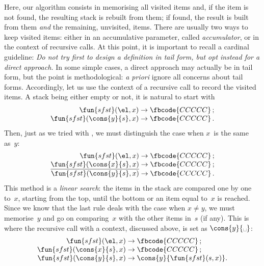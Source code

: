 Here, our algorithm consists in memorising all visited items and, if
the item is not found, the resulting stack is rebuilt from them; if
found, the result is built from them \emph{and} the remaining,
unvisited, items. There are usually two ways to keep visited items:
either in an accumulative parameter, called \emph{accumulator}, or in
the context of recursive calls. At this point, it is important to
recall a cardinal guideline: \emph{Do not try first to design a
definition in tail form, but opt instead for a direct approach.} In
some simple cases, a direct approach may actually be in tail form, but
the point is methodological: \emph{a priori} ignore all concerns about
tail forms. Accordingly, let us use the context of a recursive call to
record the visited items. A stack being either empty or not, it is
natural to start with
\begin{equation*}
\begin{array}{r@{\;}l@{\;}l}
\fun{sfst}(\el,x) & \rightarrow & \fbcode{CCCCC}\,;\\
\fun{sfst}(\cons{y}{s},x) & \rightarrow & \fbcode{CCCCC}\,.
\end{array}
\end{equation*}
Then, just as we tried with , we must distinguish the
case when \(x\)~is the same as~\(y\):
\begin{equation*}
\begin{array}{r@{\;}l@{\;}l}
\fun{sfst}(\el,x) & \rightarrow & \fbcode{CCCCC}\,;\\
\underline{\fun{sfst}(\cons{x}{s},x)} & \rightarrow & \fbcode{CCCCC}\,;\\
\fun{sfst}(\cons{y}{s},x) & \rightarrow & \fbcode{CCCCC}\,.
\end{array}
\end{equation*}
This method is a \emph{linear search}: the items
in the stack are compared one by one to~\(x\), starting from the top,
until the bottom or an item equal to~\(x\) is reached. Since we know
that the last rule deals with the case when \(x \neq y\), we must
memorise~\(y\) and go on comparing~\(x\) with the other items in~\(s\)
(if any). This is where the recursive call with a context, discussed
above, is set as \(\cons{y}{\text{\textvisiblespace}}\):
\begin{equation*}
\begin{array}{r@{\;}l@{\;}l}
\fun{sfst}(\el,x) & \rightarrow & \fbcode{CCCCC}\,;\\
\fun{sfst}(\cons{x}{s},x) & \rightarrow & \fbcode{CCCCC}\,;\\
\fun{sfst}(\cons{y}{s},x) & \rightarrow & \cons{y}{\fun{sfst}(s,x)}.
\end{array}
\end{equation*}
